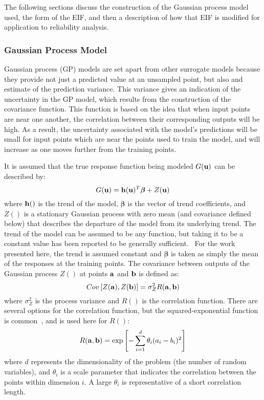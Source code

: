 The following sections discuss the construction of the Gaussian process model
used, the form of the EIF, and then a description of how that EIF is modified
for application to reliability analysis.

\subsubsection{Gaussian Process Model}\label{uq:reliability:global:ego:gpm}

Gaussian process (GP) models are set apart from other surrogate models because
they provide not just a predicted value at an unsampled point, but also and
estimate of the prediction variance.
This variance gives an indication of the uncertainty in the GP model, which
results from the construction of the covariance function. 
This function is based on the idea that when input points are near one another,
the correlation between their corresponding outputs will be high.
As a result, the uncertainty associated with the model's predictions will be
small for input points which are near the points used to train the model,
and will increase as one moves further from the training points.

It is assumed that the true response function being modeled $G({\bf u})$ can 
be described by:~\cite{Cre91}
\begin{equation}
G({\bf u})={\bf h}({\bf u})^T{\boldsymbol \beta} + Z({\bf u})
\end{equation}
\noindent where ${\bf h}()$ is the trend of the model, 
${\boldsymbol \beta}$ is the vector of trend coefficients, and
$Z()$ is a stationary Gaussian process with zero mean (and covariance defined 
below) that describes the departure of the model from its underlying trend.
The trend of the model can be assumed to be any function, but
taking it to be a constant value has been reported to be generally sufficient.~\cite{Sac89}
For the work presented here, the trend is assumed constant and
${\boldsymbol \beta}$ is taken as simply the mean of the responses at
the training points.
The covariance between outputs of the Gaussian process $Z()$ at points 
${\bf a}$ and ${\bf b}$ is defined as:
\begin{equation}
Cov \left[ Z({\bf a}),Z({\bf b}) \right] = \sigma_Z^2 R({\bf a},{\bf b})
\label{eq:cov}
\end{equation}
\noindent where $\sigma_Z^2$ is the process variance and $R()$ is the
correlation function.
There are several options for the correlation function, but the 
squared-exponential function is common~\cite{Sac89}, and is used here for $R()$:
\begin{equation}
R({\bf a},{\bf b}) = \exp \left[ -\sum_{i=1}^d \theta_i(a_i - b_i)^2 \right]
\end{equation}
\noindent where $d$ represents the dimensionality of the problem
(the number of random variables), and 
$\theta_i$ is a scale parameter that indicates the correlation between the 
points within dimension $i$.
A large $\theta_i$ is representative of a short correlation length.

